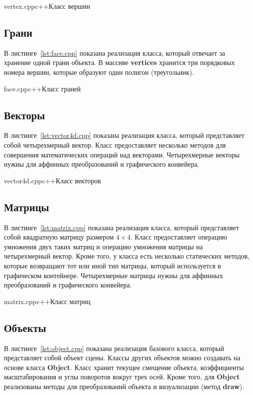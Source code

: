 {vertex.cpp}{c++}{Класс вершин}

\subsection{Грани}

В листинге~\ref{lst:face.cpp} показана реализация класса, который отвечает за хранение одной грани объекта. 
В массиве \textbf{vertices} хранится три порядковых номера вершин, которые образуют один полигон (треугольник).

{face.cpp}{c++}{Класс граней}

\subsection{Векторы}

В листинге~\ref{lst:vector4d.cpp} показана реализация класса, который представляет собой четырехмерный вектор. 
Класс предоставляет несколько методов для совершения математических операций над векторами. 
Четырехмерные векторы нужны для аффинных преобразований и графического конвейера.

{vector4d.cpp}{c++}{Класс векторов}

\subsection{Матрицы}

В листинге~\ref{lst:matrix.cpp} показана реализация класса, который представляет собой квадратную матрицу размером $4 \times 4$. 
Класс предоставляет операцию умножения двух таких матриц и операцию умножения матрицы на четырехмерный вектор. 
Кроме того, у класса есть несколько статических методов, которые возвращают тот или иной тип матрицы, который используется в графическом контейнере. 
Четырехмерные матрицы нужны для аффинных преобразований и графического конвейера.

{matrix.cpp}{c++}{Класс матриц}

\subsection{Объекты}

В листинге~\ref{lst:object.cpp} показана реализация базового класса, который представляет собой объект сцены. 
Классы других объектов можно создавать на основе класса \textbf{Object}. 
Класс хранит текущее смещение объекта, коэффициенты масштабирования и углы поворотов вокруг трех осей. 
Кроме того, для \textbf{Object} реализованы методы для преобразований объекта и визуализации (метод \textbf{draw}).

